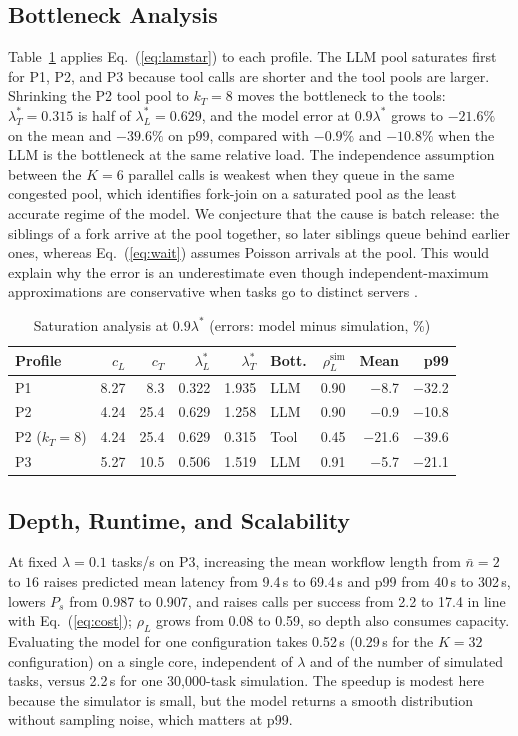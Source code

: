 \documentclass[journal]{IEEEtran}
\begin{document}
\subsection{Bottleneck Analysis}
Table~\ref{tab:bott} applies Eq.~(\ref{eq:lamstar}) to each profile. The LLM pool saturates first for P1, P2, and P3 because tool calls are shorter and the tool pools are larger. Shrinking the P2 tool pool to $k_T=8$ moves the bottleneck to the tools: $\lambda^\ast_T=0.315$ is half of $\lambda^\ast_L=0.629$, and the model error at $0.9\lambda^\ast$ grows to $-21.6\%$ on the mean and $-39.6\%$ on p99, compared with $-0.9\%$ and $-10.8\%$ when the LLM is the bottleneck at the same relative load. The independence assumption between the $K{=}6$ parallel calls is weakest when they queue in the same congested pool, which identifies fork-join on a saturated pool as the least accurate regime of the model. We conjecture that the cause is batch release: the siblings of a fork arrive at the pool together, so later siblings queue behind earlier ones, whereas Eq.~(\ref{eq:wait}) assumes Poisson arrivals at the pool. This would explain why the error is an underestimate even though independent-maximum approximations are conservative when tasks go to distinct servers \cite{thomasian2014forkjoin}.
\begin{table}[t]
\caption{Saturation analysis at $0.9\lambda^\ast$ (errors: model minus simulation, \%)}
\label{tab:bott}
\centering
\footnotesize
\setlength{\tabcolsep}{2.5pt}
\begin{tabular}{lrrrrlrrr}
\toprule
Profile & $c_L$ & $c_T$ & $\lambda^\ast_L$ & $\lambda^\ast_T$ & Bott. & $\rho_L^{\mathrm{sim}}$ & Mean & p99 \\
\midrule
P1 & 8.27 & 8.3 & 0.322 & 1.935 & LLM & 0.90 & $-$8.7 & $-$32.2 \\
P2 & 4.24 & 25.4 & 0.629 & 1.258 & LLM & 0.90 & $-$0.9 & $-$10.8 \\
P2 ($k_T{=}8$) & 4.24 & 25.4 & 0.629 & 0.315 & Tool & 0.45 & $-$21.6 & $-$39.6 \\
P3 & 5.27 & 10.5 & 0.506 & 1.519 & LLM & 0.91 & $-$5.7 & $-$21.1 \\
\bottomrule
\end{tabular}
\end{table}

\subsection{Depth, Runtime, and Scalability}
At fixed $\lambda=0.1$ tasks/s on P3, increasing the mean workflow length from $\bar n=2$ to $16$ raises predicted mean latency from 9.4\,s to 69.4\,s and p99 from 40\,s to 302\,s, lowers $P_s$ from 0.987 to 0.907, and raises calls per success from 2.2 to 17.4 in line with Eq.~(\ref{eq:cost}); $\rho_L$ grows from 0.08 to 0.59, so depth also consumes capacity. Evaluating the model for one configuration takes 0.52\,s (0.29\,s for the $K=32$ configuration) on a single core, independent of $\lambda$ and of the number of simulated tasks, versus 2.2\,s for one 30{,}000-task simulation. The speedup is modest here because the simulator is small, but the model returns a smooth distribution without sampling noise, which matters at p99.
\end{document}
